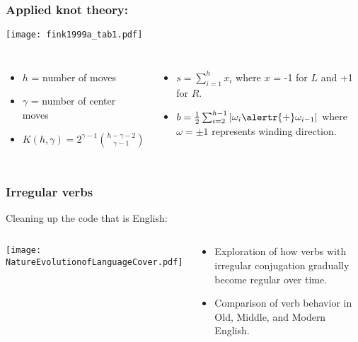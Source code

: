 \begin{frame}
  \small
  \frametitle{Applied knot theory:}

  \begin{center}
    \texttt{[image: fink1999a\_tab1.pdf]}
  \end{center}

  \begin{columns}
    \begin{itemize}
    \item 
      $h$ = number of moves
    \item 
      $\gamma$ = number of center moves
    \item 
      $
      K(h,\gamma)
      =
      2^{\gamma-1}
      \binom{h-\gamma-2}
      {\gamma-1}
      $
    \end{itemize}
    \begin{itemize}
    \item 
      $
      s 
      = 
      \sum_{i=1}^{h} 
      x_{i}
      $
      where $x$ = -1 for $L$ and +1 for $R$.
    \item 
      $
      b 
      = 
      \frac{1}{2}
      \sum_{i=2}^{h-1}
      \left|
        \omega_{i} \alertr{+} \omega_{i-1}
      \right|
      $
      where $\omega = \pm 1$ represents winding direction.
    \end{itemize}
  \end{columns}

\end{frame}




\begin{frame}
  \frametitle{Irregular verbs}

  \begin{block}{Cleaning up the code that is English:}
  \end{block}

  \begin{columns}
    \texttt{[image: NatureEvolutionofLanguageCover.pdf]}
    \begin{block}{}
      \begin{itemize}
      \item<1-> 
        Exploration of how verbs with irregular 
        conjugation gradually become regular over time.
      \item<1-> 
        Comparison of verb behavior in Old, Middle, and Modern English.
      \end{itemize}
    \end{block}
  \end{columns}

\end{frame}
  
